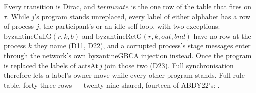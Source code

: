 \begin{definition}
  Every transition is Dirac, and $terminate$ is the one row of the table that fires on $\tau$.
  While $j$'s program stands unreplaced, every label of either alphabet has a row of process $j$, the participant's or an idle self-loop, with two exceptions: $\mathrm{byzantineCallG}(r,k,b)$ and $\mathrm{byzantineRetG}(r,k,out,bnd)$ have no row at the process $k$ they name (D11, D22), and a corrupted process's stage messages enter through the network's own $\mathrm{byzantineGBCA}$ injection instead.
  Once the program is replaced the labels of $\mathrm{actsAt}\,j$ join those two (D23).
  Full synchronisation therefore lets a label's owner move while every other program stands.
  Full rule table, forty-three rows --- twenty-nine shared, fourteen of ABDY22's: .
\end{definition}
